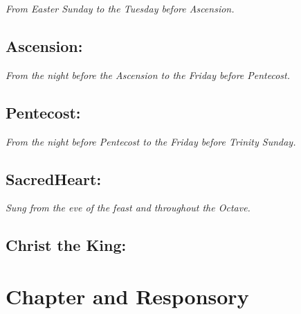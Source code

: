 \documentclass[a5paper,12pt,twoside,openany]{memoir}
\newcommand\rubrics[1]{\textit{#1}}
\begin{document}
\rubrics{From Easter Sunday to the Tuesday before Ascension.}


\section{Ascension:}

\rubrics{From the night before the Ascension to the Friday before Pentecost.}


\section{Pentecost:}

\rubrics{From the night before Pentecost to the Friday before Trinity Sunday.}





\section{SacredHeart:}

\rubrics{Sung from the eve of the feast and throughout the Octave.}


\section{Christ the King:}


\chapter{Chapter and Responsory}
\end{document}
